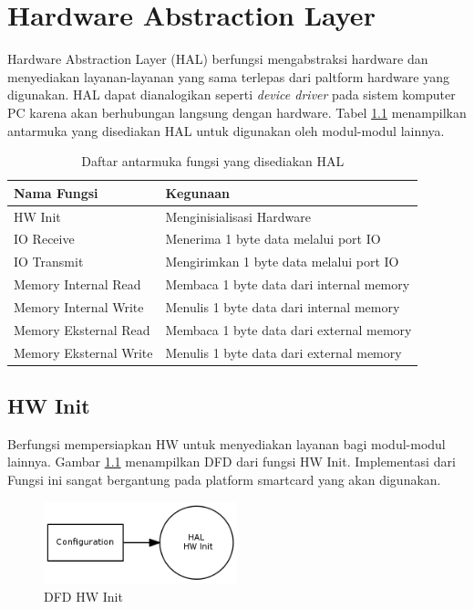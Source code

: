 \chapter{Hardware Abstraction Layer}
\label{chap_hal}

Hardware Abstraction Layer (HAL) berfungsi mengabstraksi hardware dan menyediakan layanan-layanan yang sama terlepas dari paltform hardware yang digunakan. HAL dapat dianalogikan seperti \emph{device driver} pada sistem komputer PC karena akan berhubungan langsung dengan hardware. Tabel \ref{tabel-func-hal} menampilkan antarmuka yang disediakan HAL untuk digunakan oleh modul-modul lainnya.

\begin{table}[h]
  \centering
  \begin{tabular}{|m{5cm}|m{8cm}|}
    \hline
    \bf{Nama Fungsi} & \bf{Kegunaan} \\
    \hline
    HW Init & Menginisialisasi Hardware \\
    \hline
    IO Receive & Menerima 1 byte data melalui port IO \\
    \hline
    IO Transmit & Mengirimkan 1 byte data melalui port IO \\
    \hline
    Memory Internal Read & Membaca 1 byte data dari internal memory \\
    \hline
    Memory Internal Write & Menulis 1 byte data dari internal memory \\
    \hline
    Memory Eksternal Read & Membaca 1 byte data dari external memory \\
    \hline
    Memory Eksternal Write & Menulis 1 byte data dari external memory \\
    \hline
  \end{tabular}
  \caption{Daftar antarmuka fungsi yang disediakan HAL}
  \label{tabel-func-hal}
\end{table}

\section{HW Init}
\label{sec_hwinit}

Berfungsi mempersiapkan HW untuk menyediakan layanan bagi modul-modul lainnya. Gambar \ref{fig-dfd-hwinit} menampilkan DFD dari fungsi HW Init. Implementasi dari Fungsi ini sangat bergantung pada platform smartcard yang akan digunakan. 

\begin{figure}[!h]
\centering
\includegraphics[width=0.5\textwidth]{image/hal/dfd_hwinit.png}
\caption{DFD HW Init}
\label{fig-dfd-hwinit}
\end{figure}

